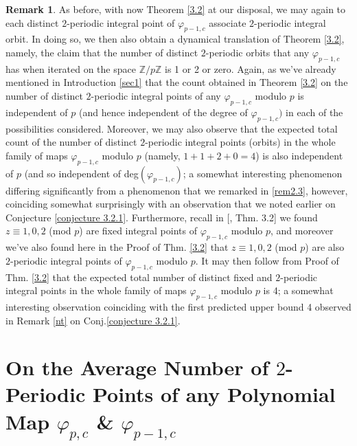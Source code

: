 \documentclass{article}
\theoremstyle{plain}
\theoremstyle{definition}
\newtheorem{rem}[thm]{Remark}
\begin{document}
\begin{rem}\label{re3.3}
As before, with now Theorem \ref{3.2} at our disposal, we may again to each distinct $2$-periodic integral point of $\varphi_{p-1,c}$ associate $2$-periodic integral orbit. In doing so, we then also obtain a dynamical translation of Theorem \ref{3.2}, namely, the claim that the number of distinct $2$-periodic orbits that any $\varphi_{p-1,c}$ has when iterated on the space $\mathbb{Z} / p\mathbb{Z}$ is 1 or 2 or zero. Again, as we've already mentioned in Introduction \ref{sec1} that the count obtained in Theorem \ref{3.2} on the number of distinct $2$-periodic integral points of any $\varphi_{p-1,c}$ modulo $p$ is independent of $p$ (and hence independent of the degree of $\varphi_{p-1,c})$ in each of the possibilities considered. Moreover, we may also observe that the expected total count of the number of distinct $2$-periodic integral points (orbits) in the whole family of maps $\varphi_{p-1,c}$ modulo $p$ (namely, $1 + 1 + 2 + 0 =4$) is also independent of $p$ (and so independent of deg$(\varphi_{p-1,c})$; a somewhat interesting phenomenon differing significantly from a phenomenon that we remarked in \ref{rem2.3}, however, coinciding somewhat surprisingly with an observation that we noted earlier on Conjecture \ref{conjecture 3.2.1}. Furthermore, recall in [\cite{BK1}, Thm. 3.2] we found $z\equiv 1, 0, 2$ (mod $p$) are fixed integral points of $\varphi_{p-1,c}$ modulo $p$, and moreover we've  also found here in the Proof of Thm. \ref{3.2} that $z\equiv 1, 0, 2$ (mod $p$) are also $2$-periodic integral points of $\varphi_{p-1,c}$ modulo $p$. It may then follow from Proof of Thm. \ref{3.2} that the expected total number of distinct fixed and $2$-periodic integral points in the whole family of maps $\varphi_{p-1,c}$ modulo $p$ is 4; a somewhat interesting observation coinciding with the first predicted upper bound 4 observed in Remark \ref{nt} on Conj.\ref{conjecture 3.2.1}.   
\end{rem}

\section{On the Average Number of $2$-Periodic Points of any Polynomial Map $\varphi_{p,c}$ \& $\varphi_{p-1,c}$ }\label{sec4}
\end{document}
